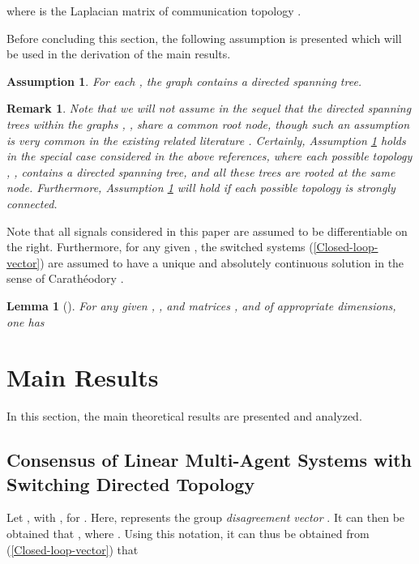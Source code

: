\documentclass[letterpaper, 10 pt, conference]{ieeeconf}
\newtheorem{lemma}{Lemma}
\newtheorem{remark}{Remark}
\newtheorem{assumption}{Assumption}
\begin{document}
where  is the Laplacian matrix of communication topology .


Before concluding this section, the following assumption is presented which
will be used in the derivation of  the main results.
\begin{assumption}\label{AssumptionTopology}
For each , the graph  contains a directed spanning tree.
\end{assumption}

\begin{remark}
Note that we will not assume in the sequel that the directed spanning trees
within the graphs , , share a
common root node, though such an assumption is very common in the existing
related literature
\cite{WenHuYuChenCaoSCL2013,WenYuCaoHuChenASCC2013,GaoZhuChenZhangMPE2013}.
Certainly, Assumption \ref{AssumptionTopology} holds in the special case
considered in the above references, where
each possible topology , , contains a directed spanning tree, and all these trees
are rooted at the same node. Furthermore,
Assumption \ref{AssumptionTopology} will hold if each possible topology is
strongly connected.
\end{remark}
\par
Note that all signals considered in this paper are assumed to be
differentiable on the right. Furthermore, for any given  , the switched systems (\ref{Closed-loop-vector}) are
assumed to have a unique and absolutely
continuous solution  in the sense of Carath\'{e}odory
\cite{DianelBook2003}.

\begin{lemma}[\cite{HornMatrix}]\label{lemmaInequality}
For any given , , and matrices ,  and  of appropriate
dimensions, one has

\end{lemma}

\section{Main Results}
In this section, the main theoretical results are presented and analyzed.
\par
\subsection{Consensus of Linear Multi-Agent Systems with Switching Directed Topology}
Let , with
, for .
Here,  represents the group
\emph{disagreement vector} \cite{SaberMurrayTAC2005}.
It can then be
obtained that , where
. Using this notation, it can thus be obtained from
(\ref{Closed-loop-vector}) that
\end{document}
